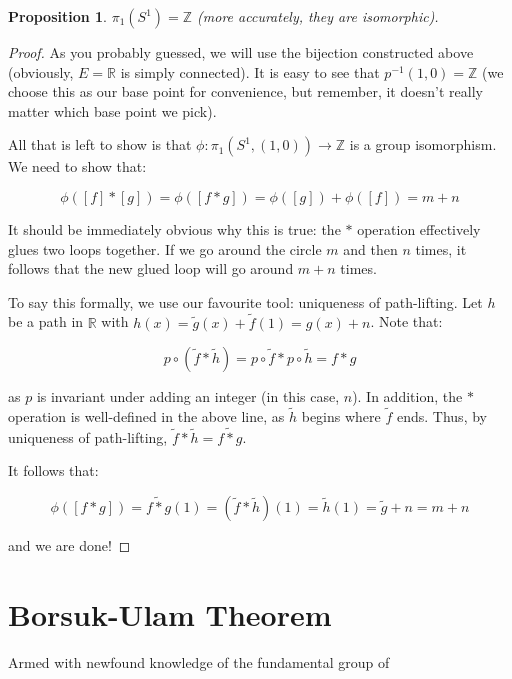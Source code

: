 \documentclass[10pt, oneside]{amsart}
\newtheorem{prop}{Proposition}
\begin{document}
    \begin{prop}
      $\pi_1(S^1) = \mathbb{Z}$ (more accurately, they are isomorphic).
    \end{prop}

    \begin{proof}
      As you probably guessed, we will use the bijection constructed above (obviously, $E = \mathbb{R}$ is simply connected). It is easy to see that $p^{-1}(1, 0) = \mathbb{Z}$ (we choose
      this as our base point for convenience, but remember, it doesn't really matter which base point we pick).
      \newline

      All that is left to show is that $\phi : \pi_1(S^1, (1, 0)) \rightarrow \mathbb{Z}$ is a group isomorphism. We need to show that:

      $$\phi([f] * [g]) = \phi([f * g]) = \phi([g]) + \phi([f]) = m + n$$

      It should be immediately obvious why this is true: the $*$ operation effectively glues two loops together. If we go around the circle $m$ and then $n$ times, it follows that the new glued loop will go around $m + n$ times.
      \newline

      To say this formally, we use our favourite tool: uniqueness of path-lifting. Let $h$ be a path in $\mathbb{R}$ with $h(x) = \tilde{g}(x) + \tilde{f}(1) = g(x) + n$. Note that:

      $$p \circ (\tilde{f} * \tilde{h}) = p \circ \tilde{f} * p \circ \tilde{h} = f * g$$

      as $p$ is invariant under adding an integer (in this case, $n$). In addition, the $*$ operation is well-defined in the above line, as $\tilde{h}$ begins where $\tilde{f}$ ends. Thus, by uniqueness
      of path-lifting, $\tilde{f} * \tilde{h} = \tilde{f * g}$.
      \newline

      It follows that:

      $$\phi([f * g]) = \tilde{f * g}(1) = (\tilde{f} * \tilde{h})(1) = \tilde{h}(1) = \tilde{g} + n = m + n$$

      and we are done!
      \end{proof}

    \section{Borsuk-Ulam Theorem}

    Armed with newfound knowledge of the fundamental group of 
\end{document}
